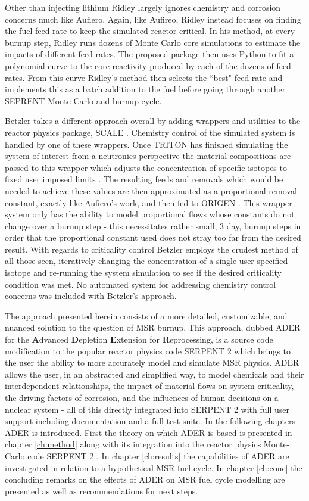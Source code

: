 Other than
injecting lithium Ridley largely ignores chemistry and corrosion concerns much
like Aufiero. Again, like Aufireo, Ridley instead focuses on finding the fuel
feed rate to keep the simulated reactor critical. In his method, at every
burnup step, Ridley runs dozens of Monte Carlo core simulations to estimate
the impacts of different feed rates. The proposed package then uses Python to
fit a polynomial curve to the core reactivity produced by each of the dozens
of feed rates. From this curve Ridley's method then selects the ``best" feed
rate and implements this as a batch addition to the fuel before going through
another SEPRENT Monte Carlo and burnup cycle. 

Betzler takes a different approach overall by adding wrappers and utilities
to the reactor physics package, SCALE \cite{Betzler} \cite{SCALE}. 
Chemistry control of the simulated
system is handled by one of these wrappers. Once TRITON has finished simulating
the system of interest from a neutronics perspective the material compositions
are passed to this wrapper which adjusts the concentration of specific isotopes
to fixed user imposed limits \cite{TRITON}. 
The resulting feeds and removals which would be
needed to achieve these values are then approximated as a proportional removal
constant, exactly like Aufiero's work, and then fed to ORIGEN \cite{ORIGEN}.
 This wrapper
system only has the ability to model proportional flows whose constants do not
change over a burnup step - this necessitates rather small, 3 day, burnup steps
in order that the proportional constant used does not stray too far from the
desired result. With regards to criticality control Betzler employs the crudest
method of all those seen, iteratively changing the concentration of a single
user specified isotope and re-running the system simulation to see if the
desired criticality condition was met. No automated system for addressing
chemistry control concerns was included with Betzler's approach. 

The approach presented herein consists of a more detailed, customizable, and
nuanced solution to the question of MSR burnup. This approach, dubbed ADER for
the \textbf{A}dvanced \textbf{D}epletion \textbf{E}xtension for 
\textbf{R}eprocessing, is a source code modification to the popular reactor
physics code SERPENT 2 which brings to the user the ability to more accurately
model and simulate MSR physics. ADER allows the user, in an abstracted and
simplified way, to model chemicals and their interdependent relationships, the
impact of material flows on system criticality, the driving factors of 
corrosion, and the influences of human decisions on a nuclear system - all of 
this directly integrated into SERPENT 2 with full user support including
documentation and a full test suite. 
In the following chapters ADER is introduced. First the theory 
on which ADER is based is
presented in chapter \ref{ch:method} along with its integration into the reactor
physics Monte-Carlo code SERPENT 2 \cite{Jaakko}. In chapter
\ref{ch:results} the capabilities of ADER are investigated in relation to a
hypothetical MSR fuel cycle. In chapter \ref{ch:conc} the concluding remarks
on the effects of ADER on
MSR fuel cycle modelling are presented as well as recommendations for next
steps. 
